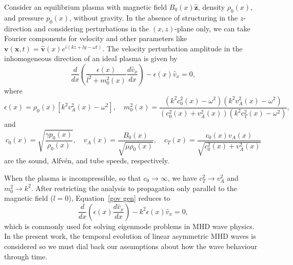 \documentclass{aastex61}
\begin{document}
Consider an equilibrium plasma with magnetic field $B_0(x)\mathbf{\hat{z}}$, density $\rho_0(x)$, and pressure $p_0(x)$, without gravity. In the absence of structuring in the $z$-direction and considering perturbations in the $(x,z)$-plane only, we can take Fourier components for velocity and other parameters like $\mathbf{v}(\mathbf{x},t) = \mathbf{\hat{v}}(x)e^{i(kz + ly - \omega t)}$. The velocity perturbation amplitude in the inhomogeneous direction of an ideal plasma is given by
\begin{equation}
\frac{d}{dx}\left(\frac{\epsilon(x)}{l^2 + m_0^2(x)} \frac{d\hat{v}_x}{dx}\right) - \epsilon(x)\hat{v}_x = 0,
\label{gov gen}
\end{equation}
where
\begin{equation}
\epsilon(x) = \rho_0(x)[k^2v_A^2(x)-\omega^2], \quad
m_0^2(x) = \frac{(k^2c_0^2(x) - \omega^2)(k^2v_A^2(x) - \omega^2)}{(c_0^2(x) + v_A^2(x))(k^2c_T^2(x) - \omega^2)},
\end{equation}
and
\begin{equation}
c_0(x) = \sqrt{\frac{\gamma p_0(x)}{\rho_0(x)}}, \quad
v_A(x) = \frac{B_0(x)}{\sqrt{\mu \rho_0(x)}}, \quad
c_T(x) = \frac{c_0(x)v_A(x)}{\sqrt{c_0^2(x) + v_A^2(x)}}
\end{equation} are the sound, Alfv\'{e}n, and tube speeds, respectively.

When the plasma is incompressible, so that $c_0 \to \infty$, we have $c_T^2 \to v_A^2$ and $m_0^2 \to k^2$. After restricting the analysis to propagation only parallel to the magnetic field ($l = 0$), Equation~\eqref{gov gen} reduces to
\begin{equation}
\frac{d}{dx}\left(\epsilon(x) \frac{d\hat{v}_x}{dx}\right) - k^2\epsilon(x)\hat{v}_x = 0,
\label{gov}
\end{equation}
which is commonly used for solving eigenmode problems in MHD wave physics. In the present work, the temporal evolution of linear asymmetric MHD waves is considered so we must dial back our assumptions about how the wave behaviour through time.
\end{document}

